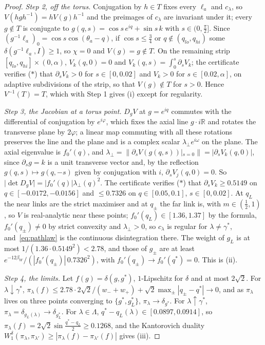 \documentclass[11pt]{amsart}
\theoremstyle{definition}
\theoremstyle{remark}
\numberwithin{equation}{section}
\newcommand{\R}{\mathbb{R}}
\begin{document}
\begin{proof}
\emph{Step 2, off the torus.} Conjugation by $h\in T$ fixes every $\ell_a$
and $c_\lambda$, so $V(hgh^{-1})=hV(g)h^{-1}$ and the preimages of $c_\lambda$
are invariant under it; every $g\notin T$ is conjugate to $g(q,s)=\cos s\,
e^{iq}+\sin s\,k$ with $s\in(0,\frac\pi2]$. Since $(g^{-1}\ell_a)_0=\cos s
\cos(\theta_a-q)$, if $\cos s\le\frac34$ or $q\notin(q_{lo},q_{hi})$ some
$\delta(g^{-1}\ell_a,I)\ge1$, so $\chi=0$ and $V(g)=g\notin T$. On the
remaining strip $[q_{lo},q_{hi}]\times(0,\alpha)$, $V_k(q,0)=0$ and
$V_k(q,s)=\int_0^s\partial_sV_k$; the certificate verifies ($\ast$) that
$\partial_sV_k>0$ for $s\in[0,0.02]$ and $V_k>0$ for $s\in[0.02,\alpha]$,
on adaptive subdivisions of the strip, so that $V(g)\notin T$ for $s>0$.
Hence $V^{-1}(T)=T$, which with Step 1 gives (i) except for regularity.

\emph{Step 3, the Jacobian at a torus point.} $D_gV$ at $g=e^{iq}$
commutes with the differential of conjugation by $e^{i\varphi}$, which
fixes the axial line $g\cdot i\R$ and rotates the transverse plane by
$2\varphi$; a linear map commuting with all these rotations preserves the
line and the plane and is a complex scalar $\lambda_\perp e^{i\omega}$ on the
plane. The axial eigenvalue is $f_0'(q)$, and $\lambda_\perp=\lVert\partial_s
V(g(q,s))|_{s=0}\rVert=|\partial_sV_k(q,0)|$, since $\partial_sg=k$ is a unit
transverse vector and, by the reflection $g(q,s)\mapsto g(q,-s)$ given by
conjugation with $i$, $\partial_sV_j(q,0)=0$. So $\lvert\det D_gV\rvert=
|f_0'(q)|\lambda_\perp(q)^2$. The certificate verifies ($\ast$) that
$\partial_sV_k\ge0.5149$ on $q\in[-0.0172,-0.0156]$ and $\le0.7326$ on
$q\in[0.05,0.1]$, $s\in[0,0.02]$. At $q_L$ the near links are the strict
maximiser and at $q_\pm$ the far link is, with $m\in(\frac12,1)$, so $V$ is
real-analytic near these points; $f_0'(q_L)\in[1.36,1.37]$ by the formula,
$f_0'(q_\pm)\ne0$ by strict convexity and $\lambda_\perp>0$, so $c_\lambda$
is regular for $\lambda\ne\gamma^*$, and~\eqref{eq:pathlaw} is the
continuous disintegration there. The weight of $g_L$ is at most $1/(1.36
\cdot0.5149^2)<2.78$, and those of $g_\pm$ are at least $e^{-12\beta_W}/(
|f_0'(q_\pm)|\,0.7326^2)$, with $f_0'(q_\pm)\to f_0'(q^*)=0$. This is (ii).

\emph{Step 4, the limits.} Let $f(g)=\delta(g,g^*)$, $1$-Lipschitz for
$\delta$ and at most $2\sqrt2$. For $\lambda\downarrow\gamma^*$,
$\pi_\lambda(f)\le2.78\cdot2\sqrt2/(w_-+w_+)+\sqrt2\max_\pm|q_\pm-q^*|\to0$,
and as $\pi_\lambda$ lives on three points converging to $\{g^*,g_L^*\}$,
$\pi_\lambda\to\delta_{g^*}$. For $\lambda\uparrow\gamma^*$, $\pi_\lambda=
\delta_{g_L(\lambda)}\to\delta_{g_L^*}$. For $\lambda\in\Lambda$, $q^*-q_L
(\lambda)\in[0.0897,0.0914]$, so $\pi_\lambda(f)=2\sqrt2\sin\frac{q^*-q_L}2
\ge0.1268$, and the Kantorovich duality $W_1^\delta(\pi_\lambda,\pi_{\lambda'})
\ge|\pi_\lambda(f)-\pi_{\lambda'}(f)|$ gives (iii).


\end{proof}
\end{document}
